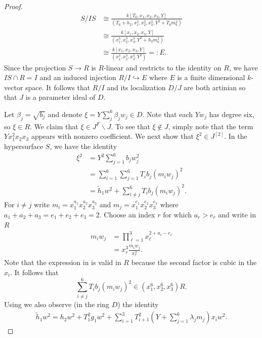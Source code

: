 \documentclass[reqno,11pt]{amsart}
\makeatletter
\numberwithin{equation}{section}
\theoremstyle{definition}
\theoremstyle{definition}
\theoremstyle{definition}
\theoremstyle{remark}
\renewcommand*{\eqref}[1]{%
  \hyperref[{#1}]{\textup{\tagform@{\ref*{#1}}}}%
}
\makeatother
\begin{document}
\begin{proof}
\begin{align*}
    S/IS &\cong \frac{k[T_6,x_1,x_2,x_3,Y]}{(T_6+h_2,x_1^3,x_2^3,x_3^3,Y^2+T_6m_6^2)}\\
    &\cong \frac{k[x_1,x_2,x_3,Y]}{(x_1^3,x_2^3,x_3^3,Y^2+h_2 m_6^2)}\\
    &\cong \frac{k[x_1,x_2,x_3,Y]}{(x_1^3,x_2^3,x_3^3,Y^2)}=:E.
\end{align*}
Since the projection $S\to R$ is $R$-linear and restricts to the identity on $R$, we have $IS\cap R=I$ and an induced injection $R/I\hookrightarrow E$ where $E$ is a finite dimensional $k$-vector space. It follows that $R/I$ and its localization $D/J$ are both artinian so that $J$ is a parameter ideal of $D$.

Let $\beta_j=\sqrt{b_j}$ and denote $\xi=Y\sum\limits_{j}^6\beta_j w_j\in D$. Note that each $Y w_j$ has degree six, so $\xi\in R$. We claim that $\xi\in J^F\smallsetminus J$. To see that $\xi\not\in J$, simply note that the term $Yx_1^2x_2x_3$ appears with nonzero coefficient. We next show that $\xi^2\in J^{[2]}$. In the hypersurface $S$, we have the identity
\begin{align}
    \xi^2&=Y^2\sum\limits_{j=1}^6 b_j w_j^2\nonumber\\
    &=\sum\limits_{i=1}^6\sum\limits_{j=1}^6 T_i b_j (m_i w_j)^2\nonumber\\
    &=\widetilde{h}_1w^2+\sum\limits_{i\neq j}^6 T_i b_j (m_i w_j)^2.\label{eq:xi-h1}
\end{align}
For $i\neq j$ write $m_i=x_1^{a_1}x_2^{a_2}x_3^{a_3}$ and $m_j=x_1^{e_1}x_2^{e_2}x_3^{e_3}$ where $a_1+a_2+a_3=e_1+e_2+e_3=2$. Choose an index $r$ for which $a_r>e_r$ and write in $R$
\begin{align}
    m_iw_j&=\prod\limits_{\ell=1}^3 x_\ell^{2+a_\ell-e_\ell}\nonumber\\
    &=x_r^3\frac{m_iw_j}{x_r^3}.\label{eq:monomial-factor-in-R}
\end{align}
Note that the expression in \eqref{eq:monomial-factor-in-R} is valid in $R$ because the second factor is cubic in the $x_i$. It follows that
\begin{equation}
    \sum\limits_{i\neq j}^6 T_i b_j (m_i w_j)^2\in (x_1^6,x_2^6,x_3^6)R.\label{eq:i-not-j}
\end{equation}
Using \eqref{eq:translated-L} we also observe (in the ring $D$) the identity 
\begin{align*}
    \widetilde{h}_1w^2=h_2w^2+T_1^2 g_1 w^2+\sum\limits_{i=1}^3 T_{i+1}^2\left(Y+\sum\limits_{j=1}^6 \lambda_j m_j\right)x_i w^2.

\end{align*}
\end{proof}
\end{document}
